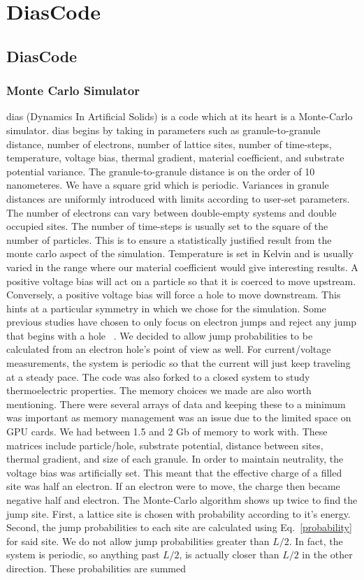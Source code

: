 \chapter{DiasCode}          %
\label{codechap}
\section{DiasCode}

\subsection{Monte Carlo Simulator}
{\sc dias} (Dynamics In Artificial Solids) is a code which at its heart is a Monte-Carlo simulator. {\sc dias} begins by taking in parameters such as granule-to-granule distance, number of electrons, number of lattice sites, number of time-steps, temperature, voltage bias, thermal gradient, material coefficient, and substrate potential variance. The granule-to-granule distance is on the order of 10 nanometeres. We have a square grid which is periodic. Variances in granule distances are uniformly introduced with limits according to user-set parameters. The number of electrons can vary between double-empty systems and double occupied sites. The number of time-steps is usually set to the square of the number of particles. This is to ensure a statistically justified result from the monte carlo aspect of the simulation. Temperature is set in Kelvin and is usually varied in the range where our material coefficient would give interesting results.  A positive voltage bias will act on a particle so that it is coerced to move upstream. Conversely, a positive voltage bias will force a hole to move downstream. This hints at a particular symmetry in which we chose for the simulation. Some previous studies have chosen to only focus on electron jumps and reject any jump that begins with a hole ~\cite{Ferrero14}. We decided to allow jump probabilities to be calculated from an electron hole's point of view as well. For current/voltage measurements, the system is periodic so that the current will just keep traveling at a steady pace. The code was also forked to a closed system to study thermoelectric properties. The memory choices we made are also worth mentioning. There were several arrays of data and keeping these to a minimum was important as memory management was an issue due to the limited space on GPU cards. We had between 1.5 and 2 Gb of memory to work with. These matrices include particle/hole, substrate potential, distance between sites, thermal gradient, and size of each granule. In order to maintain neutrality, the voltage bias was artificially set. This meant that the effective charge of a filled site was half an electron. If an electron were to move, the charge then became negative half and electron. The Monte-Carlo algorithm shows up twice to find the jump site.  First, a lattice site is chosen with probability according to it's energy. Second, the jump probabilities to each site are calculated using Eq.~\ref{probability} for said site. We do not allow jump probabilities greater than $L/2$. In fact, the system is periodic, so anything past $L/2$, is actually closer than $L/2$ in the other direction. These probabilities are summed 